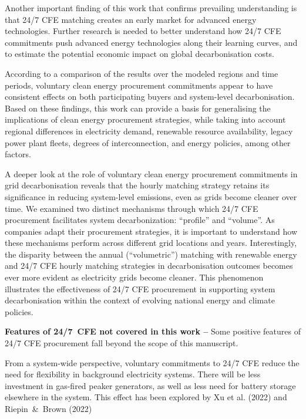 \documentclass[11pt, 5p, nopreprintline]{elsarticle}
\begin{document}
Another important finding of this work that confirms prevailing understanding is that 24/7 CFE matching creates an early market for advanced energy technologies. Further research is needed to better understand how 24/7 CFE commitments push advanced energy technologies along their learning curves, and to estimate the potential economic impact on global decarbonisation costs.

According to a comparison of the results over the modeled regions and time periods, voluntary clean energy procurement commitments appear to have consistent effects on both participating buyers and system-level decarbonisation.
Based on these findings, this work can provide a basis for generalising the implications of clean energy procurement strategies, while taking into account regional differences in electricity demand, renewable resource availability, legacy power plant fleets, degrees of interconnection, and energy policies, among other factors.

A deeper look at the role of voluntary clean energy procurement commitments in grid decarbonisation reveals that the hourly matching strategy retains its significance in reducing system-level emissions, even as grids become cleaner over time.
We examined two distinct mechanisms through which 24/7 CFE procurement facilitates system decarbonization: \enquote{profile} and \enquote{volume}.
As companies adapt their procurement strategies, it is important to understand how these mechanisms perform across different grid locations and years.
Interestingly, the disparity between the annual (\enquote{volumetric}) matching with renewable energy and 24/7 CFE hourly matching strategies in decarbonisation outcomes becomes ever more evident as electricity grids become cleaner.
This phenomenon illustrates the effectiveness of 24/7 CFE procurement in supporting system decarbonisation within the context of evolving national energy and climate policies.


\textbf{Features of 24/7~CFE not covered in this work --} Some positive features of 24/7 CFE procurement fall beyond the scope of this manuscript.

From a system-wide perspective, voluntary commitments to 24/7 CFE reduce the need for flexibility in background electricity systems.
There will be less investment in gas-fired peaker generators, as well as less need for battery storage elsewhere in the system.
This effect has been explored by Xu et al. (2022) and Riepin~\&~Brown (2022) \cite{riepin-zenodo-systemlevel247,xu-247CFE-report}
\end{document}
